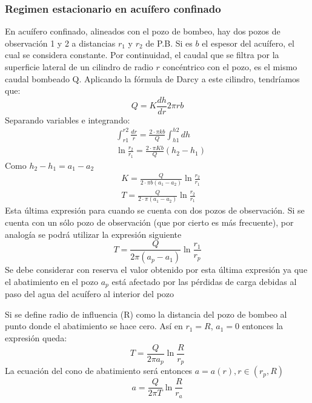 \subsubsection{Regimen estacionario en acuífero confinado}
En acuífero confinado, alineados con el pozo de bombeo, hay dos pozos de observación 1 y 2 a distancias $r_1$ y $r_2$ de P.B. Si es $b$ el espesor del acuífero, el cual se considera constante. Por continuidad, el caudal que se filtra por la superficie lateral de un cilindro de radio $r$ concéntrico con el pozo, es el mismo caudal bombeado Q. Aplicando la fórmula de Darcy a este cilindro, tendríamos que:
\begin{equation}
    Q = K \frac{dh}{dr} 2 \pi r b
\end{equation}
Separando variables e integrando:
\begin{align*}
    &\int_{r1}^{r2} \frac{dr}{r} = \frac{2 \cdot \pi kb }{Q} \int_{h1}^{h2} dh\\
    &\ln{\frac{r_2}{r_1}} =  \frac{2 \cdot \pi Kb }{Q}\left(h_2 - h_1 \right)
\end{align*}
Como $h_2-h_1=a_1-a_2$
\begin{align*}
    &K = \frac{Q}{2 \cdot \pi b\left(a_1 - a_2 \right)} \ln{\frac{r_2}{r_1}}\\
    &T = \frac{Q}{2 \cdot \pi \left(a_1 - a_2 \right)} \ln{\frac{r_2}{r_1}}
\end{align*}
Esta última expresión para cuando se cuenta con dos pozos de observación. Si se cuenta con un sólo pozo de observación (que por cierto es más frecuente), por analogía se podrá utilizar la expresión siguiente
\begin{equation}
    T= \frac{Q}{2 \pi \left(a_p - a_1 \right)}\ln{\frac{r_1}{r_p}}
\end{equation}
Se debe considerar con reserva el valor obtenido por esta última expresión ya que el abatimiento en el pozo $a_p$ está afectado por las pérdidas de carga debidas al paso del agua del acuífero al interior del pozo

Si se define radio de influencia (R) como la distancia del pozo de bombeo al punto donde el abatimiento se hace cero. Así en $r_1=R$, $a_1=0$ entonces la expresión queda:
\begin{equation}
    T= \frac{Q}{2 \pi a_p} \ln{\frac{R}{r_p}}
\end{equation}
La ecuación del cono de abatimiento será entonces $a= a(r), r\in \left(r_p,R\right)$
\begin{equation}
    a = \frac{Q}{2 \pi T}\ln{\frac{R}{r_a}}
\end{equation}

